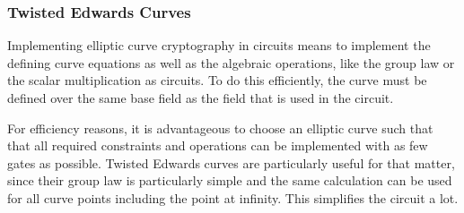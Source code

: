 \subsubsection{Twisted Edwards Curves} Implementing elliptic curve cryptography in circuits means to implement the defining curve equations as well as the algebraic operations, like the group law or the scalar multiplication as circuits. To do this efficiently, the curve must be defined over the same base field as the field that is used in the circuit. 

For efficiency reasons, it is advantageous to choose an elliptic curve such that that all required constraints and operations can be implemented with as few gates as possible. Twisted Edwards curves are particularly useful for that matter, since their group law is particularly simple and the same calculation can be used for all curve points including the point at infinity. This simplifies the circuit a lot.
